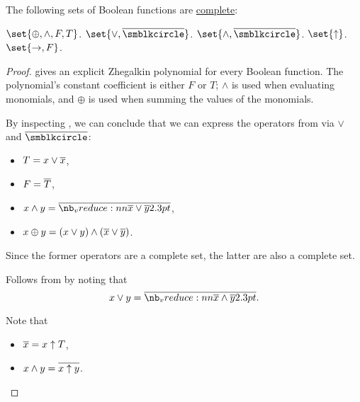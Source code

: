 \begin{proposition}\label{thm:complete_sets_of_boolean_functions}
  The following sets of Boolean functions are \hyperref[def:boolean_closure/complete]{complete}:
  \begin{thmenum}
     \( \set{ \oplus, \wedge, F, T } \).
     \( \set{ \vee, \oline{\anon} } \).
     \( \set{ \wedge, \oline{\anon} } \).
     \( \set{ \uparrow } \).
     \( \set{ \rightarrow, F } \).
  \end{thmenum}
\end{proposition}
\begin{proof}
    gives an explicit Zhegalkin polynomial for every Boolean function. The polynomial's constant coefficient is either \( F \) or \( T \); \( \wedge \) is used when evaluating monomials, and \( \oplus \) is used when summing the values of the monomials.

   By inspecting , we can conclude that we can express the operators from  via \( \vee \) and \( \oline{\anon} \):
  \begin{itemize}
    \item \( T = x \vee \oline{x} \),
    \item \( F = \oline{T} \),
    \item \( x \wedge y = \oline*{\oline{x} \vee \oline{y}} \),
    \item \( x \oplus y = (x \vee y) \wedge (\oline{x} \vee \oline{y}) \).
  \end{itemize}

  Since the former operators are a complete set, the latter are also a complete set.

   Follows from  by noting that
  \begin{equation*}
    x \vee y = \oline*{\oline x \wedge \oline y}.
  \end{equation*}

   Note that
  \begin{itemize}
    \item \( \oline{x} = x \uparrow T \),
    \item \( x \wedge y = \oline{x \uparrow y} \).
  \end{itemize}


\end{proof}
